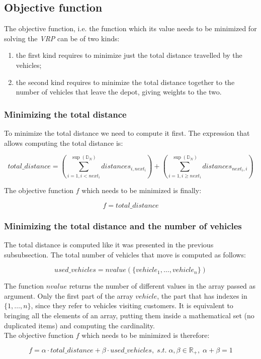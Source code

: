 \documentclass[../main.tex]{subfiles}
\begin{document}
\subsection{Objective function}
The objective function, i.e. the function which its value needs to be minimized for solving the \textit{VRP} can be of two kinds:
\begin{enumerate}
    \item the first kind requires to minimize just the total distance travelled by the vehicles;
    \item the second kind requires to minimize the total distance together to the number of vehicles that leave the depot, giving weights to the two.
\end{enumerate}
\subsubsection{Minimizing the total distance}
To minimize the total distance we need to compute it first. The expression that allows computing the total distance is:
\begin{center}
    \begin{equation}
        total\_distance = (\sum_{i = 1, i < next_i}^{\sup{}(\mathbb{D}_N)}{distances_{i, next_i}}) + (\sum_{i = 1, i \geq next_i}^{\sup{}(\mathbb{D}_N)}{distances_{next_i, i}})
    \end{equation}
\end{center}
The objective function $f$ which needs to be minimized is finally:
\begin{center}
    \begin{equation}
        f = total\_distance
    \end{equation}
\end{center}

\subsubsection{Minimizing the total distance and the number of vehicles}
The total distance is computed like it was presented in the previous subsubsection. The total number of vehicles that move is computed as follows:
\begin{center}
    \begin{equation}
        used\_vehicles = nvalue(\{vehicle_1,\dots,vehicle_n\})
    \end{equation}
\end{center}
The function $nvalue$ returns the number of different values in the array passed as argument.
Only the first part of the array $vehicle$, the part that has indexes in $\{1,\dots,n\}$, since they refer to vehicles visiting customers.
It is equivalent to bringing all the elements of an array, putting them inside a mathematical set (no duplicated items) and computing the cardinality.\\
The objective function $f$ which needs to be minimized is therefore:
\begin{center}
    \begin{equation}
        f = \alpha{} \cdot total\_distance + \beta{} \cdot used\_vehicles, \; s.t. \; \alpha{}, \beta{} \in \mathbb{R}_+, \; \alpha{} + \beta{} = 1
    \end{equation}
\end{center}
\end{document}
